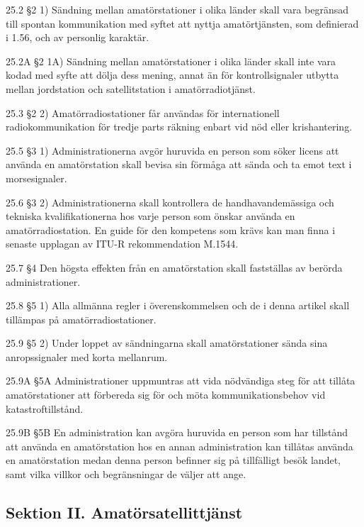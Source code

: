 25.2 \S2 1) Sändning mellan amatörstationer i olika länder skall vara
begränsad till spontan kommunikation med syftet att nyttja amatörtjänsten,
som definierad i 1.56, och av personlig karaktär.
\cite[25.2]{ITU-RR}

25.2A \S2 1A) Sändning mellan amatörstationer i olika länder skall
inte vara kodad med syfte att dölja dess mening, annat än för kontrollsignaler
utbytta mellan jordstation och satellitstation i amatörradiotjänst.
\cite[25.2A]{ITU-RR}

25.3 \S2 2) Amatörradiostationer får användas för internationell
radiokommunikation för tredje parts räkning enbart vid nöd eller
krishantering.
\cite[25.3]{ITU-RR}

25.5 \S3 1) Administrationerna avgör huruvida en person som söker licens
att använda en amatörstation skall bevisa sin förmåga att sända och ta
emot text i morsesignaler.
\cite[25.5]{ITU-RR}

25.6 \S3 2) Administrationerna skall kontrollera de handhavandemässiga och
tekniska kvalifikationerna hos varje person som önskar använda en
amatörradiostation. En guide för den kompetens som krävs kan man finna i
senaste upplagan av ITU-R rekommendation M.1544.
\cite[25.6]{ITU-RR}

25.7 \S4 Den högsta effekten från en amatörstation skall fastställas
av berörda administrationer.
\cite[25.7]{ITU-RR}

25.8 \S5 1) Alla allmänna regler i överenskommelsen och de i denna
artikel skall tillämpas på amatörradiostationer.
\cite[25.8]{ITU-RR}

25.9 \S5 2) Under loppet av sändningarna skall amatörstationer sända
sina anropssignaler med korta mellanrum.
\cite[25.9]{ITU-RR}

25.9A \S5A Administrationer uppmuntras att vida nödvändiga steg för att
tillåta amatörstationer att förbereda sig för och möta kommunikationsbehov
vid katastroftillstånd.
\cite[25.9A]{ITU-RR}

25.9B \S5B En administration kan avgöra huruvida en person som har tillstånd
att använda en amatörstation hos en annan administration kan tillåtas använda
en amatörstation medan denna person befinner sig på tillfälligt besök landet,
samt vilka villkor och begränsningar de väljer att ange.
\cite[25.9B]{ITU-RR}

\subsection{Sektion II. Amatörsatellittjänst}

